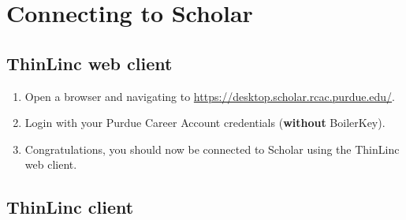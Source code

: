 \documentclass[
]{book}
\providecommand{\tightlist}{%
  \setlength{\itemsep}{0pt}\setlength{\parskip}{0pt}}
\begin{document}
\hypertarget{connecting-to-scholar}{%
\section{Connecting to Scholar}\label{connecting-to-scholar}}

\hypertarget{connecting-with-thinlinc-webclient}{%
\subsection{ThinLinc web client}\label{connecting-with-thinlinc-webclient}}

\begin{enumerate}
\def\labelenumi{\arabic{enumi}.}
\tightlist
\item
  Open a browser and navigating to \url{https://desktop.scholar.rcac.purdue.edu/}.
\item
  Login with your Purdue Career Account credentials (\textbf{without} BoilerKey).
\item
  Congratulations, you should now be connected to Scholar using the ThinLinc web client.
\end{enumerate}

\hypertarget{connecting-with-thinlinc-client}{%
\subsection{ThinLinc client}\label{connecting-with-thinlinc-client}}
\end{document}
